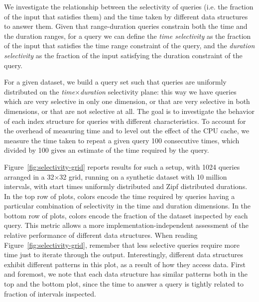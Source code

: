 \documentclass[sigconf,nonacm,anonymous]{acmart}
\theoremstyle{definition}
\begin{document}
We investigate the relationship between the selectivity of queries (i.e. the fraction of the
input that satisfies them) and the time taken by different data structures to answer them.
Given that range-duration queries constrain both the time and the duration ranges,
for a query we can define the \emph{time selectivity} as the fraction of the input that
satisfies the time range constraint of the query, and the \emph{duration selectivity} as the fraction
of the input satisfying the duration constraint of the query.

For a given dataset, we build a query set such that queries are uniformly distributed on the
\emph{time}$\times$\emph{duration} selectivity plane: this way we have queries which are
very selective in only one dimension, or that are very selective in both dimensions, or that are not
selective at all.
The goal is to investigate the behavior of each index structure for queries with different characteristics.
To account for the overhead of measuring time and to level out the effect of the CPU cache,
we measure the time taken to repeat a given query 100 consecutive times, which divided by 100
gives an estimate of the time required by the query.

Figure~\ref{fig:selectivity-grid} reports results for such a setup, with 1024 queries arranged in a 32$\times$32
grid, running on a synthetic dataset with 10 million intervals, with start times uniformly distributed and Zipf distributed durations. In the top row of plots, colors encode the time required by queries having
a particular combination of selectivity in the time and duration dimensions.
In the bottom row of plots, colors encode the fraction of the dataset inspected by each query.
This metric allows a more implementation-independent assessment of the relative performance of different data structures.
When reading Figure~\ref{fig:selectivity-grid}, remember that less selective queries require more time
just to iterate through the output.
Interestingly, different data structures exhibit different patterns in this plot, as a result
of how they access data.
First and foremost, we note that each data structure has similar patterns
both in the top and the bottom plot, since the time to answer a query is
tightly related to fraction of intervals inspected.
\end{document}
